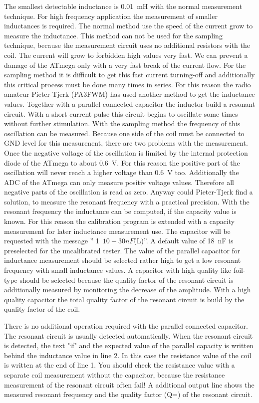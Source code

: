 The smallest detectable inductance is 0.01~mH with the normal measurement technique.
For high frequency application the measurement of smaller inductances is required.
The normal method use the speed of the current grow to measure the inductance.
This method can not be used for the sampling technique, because the measurement circuit
uses no additional resistors with the coil. The current will grow to forbidden high values
very fast. We can prevent a damage of the ATmega only with a very fast break of the current flow.
For the sampling method it is difficult to get this fast current turning-off and
additionally this critical process must be done many times in series.
For this reason the radio amateur Pieter-Tjerk (PA3FWM) has used another method to
get the inductance values.
Together with a parallel connected capacitor the inductor build a resonant circuit.
With a short current pulse this circuit begins to oscillate some times without further stimulation.
With the sampling method the frequency of this oscillation can be measured.
Because one side of the coil must be connected to GND level for this measurenent,
there are two problems with the measurement.
Once the negative voltage of the oscillation is limited by the internal protection diode
of the ATmega to about 0.6~V.  
For this reason the positive part of the oscillation will never reach a higher voltage
than 0.6~V too.
Additionally the ADC of the ATmega can only measure positiv voltage values.
Therefore all negative parts of the oscillation is read as zero.
Anyway could Pieter-Tjerk find a solution, to measure the resonant frequency with
a practical precision.
With the resonant frequency the inductance can be computed, if the capacity value is known.
For this reason the calibration program is extended with a capacity measurement for
later inductance measurement use.
The capacitor will be requested with the message '' \mbox{1  \(10-30nF\)(L)}''.
A default value of 18~nF is preselected for the uncalibrated tester.
The value of the parallel capacitor for inductance measurement should be selected
rather high to get a low resonant frequency with small inductance values.
A capacitor with high quality like foil-type should be selected because
the quality factor of the resonant circuit is additionally measured by
monitoring the decrease of the amplitude.
With a high quality capacitor the total quality factor of the resonant circuit
is build by the quality factor of the coil.

There is no additional operation required with the parallel connected capacitor.
The resonant circuit is usually detected automatically.
When the resonant circuit is detected, the text "if" and the expected value
of the parallel capacity is written behind the inductance value in line 2.
In this case the resistance value of the coil is written at the end of line 1.
You should check the resistance value with a separate coil measurement without
the capacitor, because the resistance measurement of the resonant circuit often fail!
A additional output line shows the measured resonant frequency and the quality factor (Q=)
of the resonant circuit.

